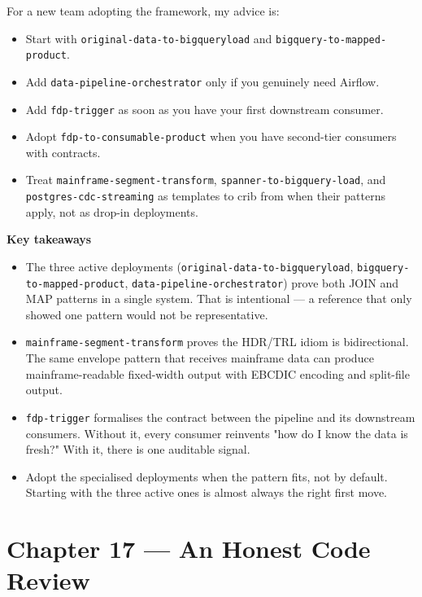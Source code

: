 \documentclass[
  11pt,
  british,
  oneside]{book}
\providecommand{\tightlist}{%
  \setlength{\itemsep}{0pt}\setlength{\parskip}{0pt}}
\begin{document}
For a new team adopting the framework, my advice is:

\begin{itemize}
\tightlist
\item
  Start with \texttt{original-data-to-bigqueryload} and
  \texttt{bigquery-to-mapped-product}.
\item
  Add \texttt{data-pipeline-orchestrator} only if you genuinely need
  Airflow.
\item
  Add \texttt{fdp-trigger} as soon as you have your first downstream
  consumer.
\item
  Adopt \texttt{fdp-to-consumable-product} when you have second-tier
  consumers with contracts.
\item
  Treat \texttt{mainframe-segment-transform},
  \texttt{spanner-to-bigquery-load}, and \texttt{postgres-cdc-streaming}
  as templates to crib from when their patterns apply, not as drop-in
  deployments.
\end{itemize}

\begin{takeaways}
\textbf{Key takeaways}
\begin{itemize}
  \item The three active deployments (\texttt{original-data-to-bigqueryload}, \texttt{bigquery-to-mapped-product}, \texttt{data-pipeline-orchestrator}) prove both JOIN and MAP patterns in a single system. That is intentional — a reference that only showed one pattern would not be representative.
  \item \texttt{mainframe-segment-transform} proves the HDR/TRL idiom is bidirectional. The same envelope pattern that receives mainframe data can produce mainframe-readable fixed-width output with EBCDIC encoding and split-file output.
  \item \texttt{fdp-trigger} formalises the contract between the pipeline and its downstream consumers. Without it, every consumer reinvents "how do I know the data is fresh?" With it, there is one auditable signal.
  \item Adopt the specialised deployments when the pattern fits, not by default. Starting with the three active ones is almost always the right first move.
\end{itemize}
\end{takeaways}

\newpage

\hypertarget{chapter-17-an-honest-code-review}{%
\chapter{Chapter 17 --- An Honest Code
Review}\label{chapter-17-an-honest-code-review}}
\end{document}

